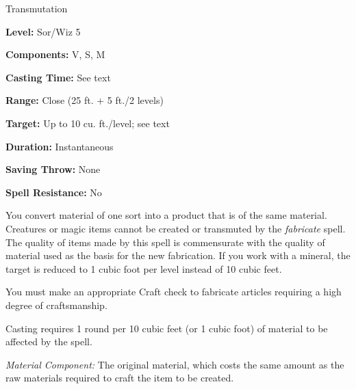 
Transmutation

\textbf{Level:} Sor/Wiz 5

\textbf{Components:} V, S, M

\textbf{Casting Time:} See text

\textbf{Range:} Close (25 ft. + 5 ft./2 levels)

\textbf{Target:} Up to 10 cu. ft./level; see text

\textbf{Duration:} Instantaneous

\textbf{Saving Throw:} None

\textbf{Spell Resistance:} No

You convert material of one sort into a product that is of the same material. Creatures 
or magic items cannot be created or transmuted by the \textit{fabricate} spell. 
The quality of items made by this spell is commensurate with the quality of material 
used as the basis for the new fabrication. If you work with a mineral, the target 
is reduced to 1 cubic foot per level instead of 10 cubic feet.

You must make an appropriate Craft check to fabricate articles requiring a high 
degree of craftsmanship.

Casting requires 1 round per 10 cubic feet (or 1 cubic foot) of material to be 
affected by the spell.

\textit{Material Component:} The original material, which costs the same amount 
as the raw materials required to craft the item to be created.

